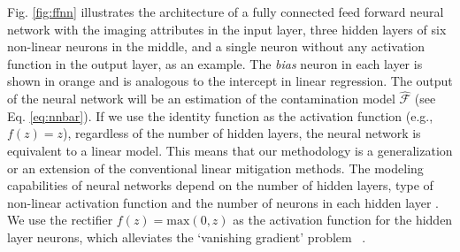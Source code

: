 \documentclass[fleqn, usenatbib]{mnras}
\begin{document}
Fig. \ref{fig:ffnn} illustrates the architecture of a fully connected feed forward neural network with the imaging attributes in the input layer, three hidden layers of six non-linear neurons in the middle, and a single neuron without any activation function in the output layer, as an example. The \textit{bias} neuron in each layer is shown in orange and is analogous to the intercept in linear regression. The output of the neural network will be an estimation of the contamination model $\hat{\mathcal{F}}$ (see Eq. \ref{eq:nnbar}). If we use the identity function as the activation function (e.g., $f(z)=z$), regardless of the number of hidden layers, the neural network is equivalent to a linear model. This means that our methodology is a generalization or an extension of the conventional linear mitigation methods. The modeling capabilities of neural networks depend on the number of hidden layers, type of non-linear activation function and the number of neurons in each hidden layer \citep[see e.g.][]{cybenko1989approximation,hornik1989multilayer,funahashi1989approximate, tamura1997capabilities, huang2003learning, lin2017does, rolnick2017power}.\\

We use the rectifier $f(z) = \text{max}(0, z)$ as the activation function for the hidden layer neurons, which alleviates the `vanishing gradient' problem
~\citep[see e.g.,][]{nair2010rectified,glorot2011deep,krizhevsky2012imagenet, dahl2013improving,montufar2014number}. \\
\end{document}
